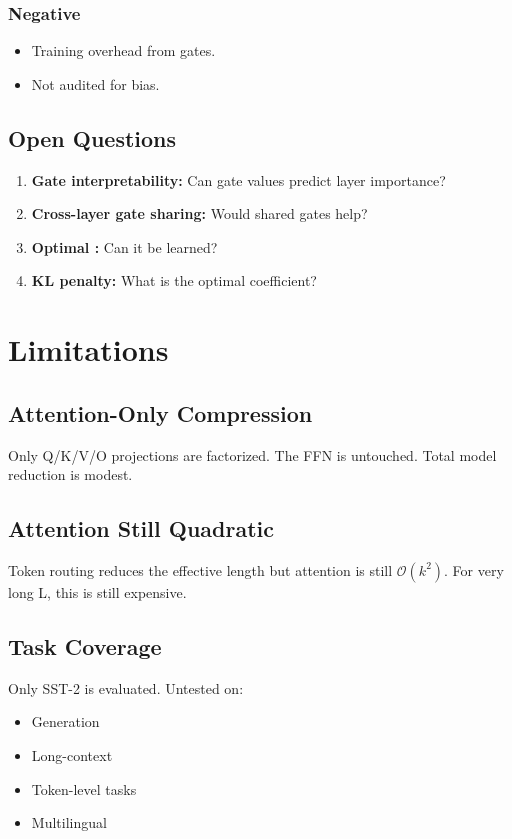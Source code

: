 \subsubsection{Negative}
\begin{itemize}
\item Training overhead from gates.
\item Not audited for bias.

\end{itemize}
\subsection{Open Questions}

\begin{enumerate}
\item \textbf{Gate interpretability:} Can gate values predict layer importance?
\item \textbf{Cross-layer gate sharing:} Would shared gates help?
\item \textbf{Optimal  :} Can it be learned?
\item \textbf{KL penalty:} What is the optimal coefficient?

\end{enumerate}


\section{Limitations}

\subsection{Attention-Only Compression}

Only Q/K/V/O projections are factorized. The FFN is untouched. Total 
model reduction is modest.

\subsection{Attention Still Quadratic}

Token routing reduces the effective length but attention is still 
$\mathcal{O}(k^2)$. For very long L, this is still expensive.

\subsection{Task Coverage}

Only SST-2 is evaluated. Untested on:
\begin{itemize}
\item Generation
\item Long-context
\item Token-level tasks
\item Multilingual

\end{itemize}
